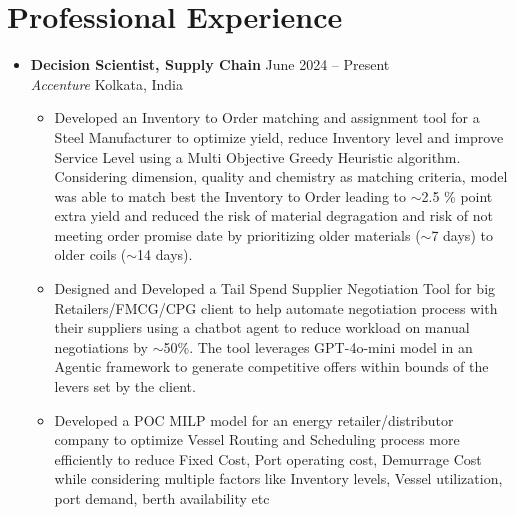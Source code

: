 \documentclass[a4paper,10pt]{article}
\newcommand{\resumeItem}[1]{\item\small{#1}}
\newcommand{\resumeSubheading}[4]{
  \vspace{1pt}\item
    \textbf{#1} \hfill {#2} \\
    \emph{#3} \hfill {#4} \\
}
\begin{document}
\section*{Professional Experience}
\begin{itemize}
    \resumeSubheading
      {Decision Scientist, Supply Chain}{June 2024 -- Present}
      {Accenture}{Kolkata, India}
      \begin{itemize}
          \resumeItem{
            Developed an Inventory to Order matching and assignment tool for a Steel Manufacturer to optimize yield, 
            reduce Inventory level and improve Service Level using a Multi Objective Greedy Heuristic algorithm.
            Considering dimension, quality and chemistry as matching criteria, model was able to match best the Inventory to Order 
            leading to $\sim$2.5 \% point extra yield and reduced the risk of material 
            degragation and risk of not meeting order promise date by prioritizing older materials ($\sim$7 days) 
            to older coils ($\sim$14 days).
          }
          \resumeItem{
            Designed and Developed a Tail Spend Supplier Negotiation Tool for big Retailers/FMCG/CPG client to help automate negotiation
            process with their suppliers using a chatbot agent to reduce workload on manual negotiations by $\sim$50\%. The tool leverages
            GPT-4o-mini model in an Agentic framework to generate competitive offers within bounds of the levers set by the client. 
          }
          \resumeItem{
            Developed a POC MILP model for an energy retailer/distributor company to optimize Vessel Routing and 
            Scheduling process more efficiently to reduce Fixed Cost, Port operating cost, Demurrage Cost while
            considering multiple factors like Inventory levels, Vessel utilization, port demand, berth availability etc
          }
      \end{itemize}


\end{itemize}
\end{document}
